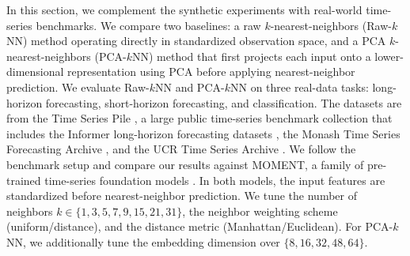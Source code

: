 \documentclass[12pt]{article}
\theoremstyle{definition}
\begin{document}

In this section, we complement the synthetic experiments with real-world time-series benchmarks. We compare two baselines: a raw $k$-nearest-neighbors (Raw-$k$NN) method operating directly in standardized observation space, and a PCA $k$-nearest-neighbors (PCA-$k$NN) method that first projects each input onto a lower-dimensional representation using PCA before applying nearest-neighbor prediction. We evaluate Raw-$k$NN and PCA-$k$NN on three real-data tasks: long-horizon forecasting, short-horizon forecasting, and classification. The datasets are from the Time Series Pile \citep{goswami2024moment}, a large public time-series benchmark collection that includes the Informer long-horizon forecasting datasets \citep{zhou2021informer}, the Monash Time Series Forecasting Archive \citep{godahewa2021monash}, and the UCR Time Series Archive \citep{dau2019ucr}. We follow the benchmark setup and compare our results against MOMENT, a family of pre-trained time-series foundation models \citep{goswami2024moment}. In both models, the input features are standardized before nearest-neighbor prediction. We tune the number of neighbors $k \in \{1,3,5,7,9,15,21,31\}$, the neighbor weighting scheme (uniform/distance), and the distance metric (Manhattan/Euclidean). For PCA-$k$NN, we additionally tune the embedding dimension over $\{8,16,32,48,64\}$.
\end{document}
